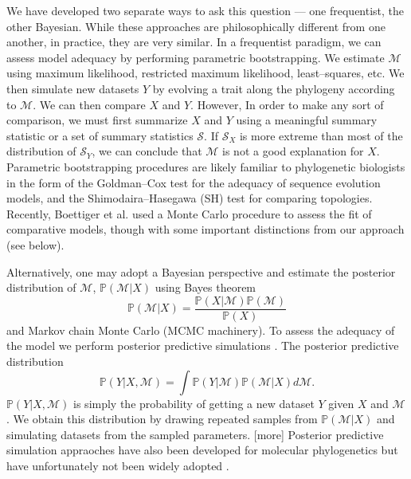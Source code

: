 \documentclass[a4paper,12pt]{article}
\begin{document}
We have developed two separate ways to ask this question --- one frequentist, the other Bayesian. While these approaches are philosophically different from one another, in practice, they are very similar. In a frequentist paradigm, we can assess model adequacy by performing parametric bootstrapping. We estimate $\mathcal{M}$ using maximum likelihood, restricted maximum likelihood, least--squares, etc. We then simulate new datasets $Y$ by evolving a trait along the phylogeny according to $\mathcal{M}$. We can then compare $X$ and $Y$. However, In order to make any sort of comparison, we must first summarize $X$ and $Y$ using a meaningful summary statistic or a set of summary statistics $\mathcal{S}$. If $\mathcal{S}_X$ is more extreme than most of the distribution of $\mathcal{S}_Y$, we can conclude that $\mathcal{M}$ is not a good explanation for $X$. Parametric bootstrapping procedures are likely familiar to phylogenetic biologists in the form of the Goldman--Cox test \citep{Goldman} for the adequacy of sequence evolution models, and the Shimodaira--Hasegawa (SH) \citep{SH} test for comparing topologies. Recently, Boettiger et al. \citep{Boettiger2012} used a Monte Carlo procedure to assess the fit of comparative models, though with some important distinctions from our approach (see below).

Alternatively, one may adopt a Bayesian perspective and estimate the posterior distribution of $\mathcal{M}$, $\mathbb{P}(\mathcal{M}|X)$ using Bayes theorem
\[\mathbb{P}(\mathcal{M}|X) = \frac{\mathbb{P}(X|\mathcal{M})\mathbb{P}(\mathcal{M})}{\mathbb{P}(X)} \]
and Markov chain Monte Carlo (MCMC machinery). To assess the adequacy of the model we perform posterior predictive simulations \citep{Rubin1984, Gelman1996}. The posterior predictive distribution
\[\mathbb{P}(Y|X,\mathcal{M}) = \int \mathbb{P}(Y|\mathcal{M})\mathbb{P}(\mathcal{M}|X)d\mathcal{M}. \]
$\mathbb{P}(Y|X,\mathcal{M})$ is simply the probability of getting a new dataset $Y$ given $X$ and $\mathcal{M}$. We obtain this distribution by drawing repeated samples from $\mathbb{P}(\mathcal{M}|X)$ and simulating datasets from the sampled parameters. [more] Posterior predictive simulation appraoches have also been developed for molecular phylogenetics \citep{Bollback2002, Reid2013, Lewis2013, Brown2013} but have unfortunately not been widely adopted \citep{Brown2013}.
\end{document}
